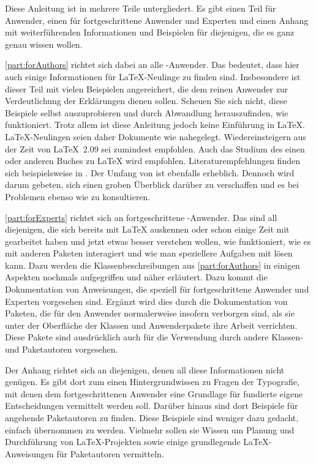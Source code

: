 Diese Anleitung ist in mehrere Teile untergliedert. Es gibt einen Teil für
Anwender, einen für fortgeschrittene Anwender und Experten und einen Anhang
mit weiterführenden Informationen und Beispielen für diejenigen, die es ganz
genau wissen wollen.

\autoref{part:forAuthors} richtet sich dabei an alle \KOMAScript-Anwender. Das
bedeutet, dass hier auch einige Informationen für \LaTeX-Neulinge zu finden
sind. Insbesondere ist dieser Teil mit vielen Beispielen angereichert, die dem
reinen Anwender zur Verdeutlichung der Erklärungen dienen sollen. Scheuen Sie
sich nicht, diese Beispiele selbst auszuprobieren und durch Abwandlung
herauszufinden, wie \KOMAScript{} funktioniert. Trotz allem ist diese
Anleitung jedoch keine Einführung in \LaTeX. \LaTeX-Neulingen seien daher
Dokumente wie \cite{l2kurz} nahegelegt. Wiedereinsteigern aus der Zeit von
\LaTeX~2.09 sei zumindest \cite{latex:usrguide} empfohlen. Auch das Studium des
einen oder anderen Buches zu \LaTeX{} wird empfohlen.  Literaturempfehlungen
finden sich beispielsweise in \cite{DANTE:FAQ}. Der Umfang von
\cite{DANTE:FAQ} ist ebenfalls erheblich. Dennoch wird darum gebeten, sich
einen groben Überblick darüber zu verschaffen und es bei Problemen ebenso wie
 zu konsultieren.

\autoref{part:forExperts} richtet sich an fortgeschrittene
\KOMAScript-Anwender. Das sind all diejenigen, die sich bereits mit \LaTeX{}
auskennen oder schon einige Zeit mit \KOMAScript{} gearbeitet haben und jetzt
etwas besser verstehen wollen, wie \KOMAScript{} funktioniert, wie es mit
anderen Paketen interagiert und wie man speziellere Aufgaben mit \KOMAScript{}
lösen kann. Dazu werden die Klassenbeschreibungen aus
\autoref{part:forAuthors} in einigen Aspekten nochmals aufgegriffen und näher
erläutert. Dazu kommt die Dokumentation von Anweisungen, die speziell für
fortgeschrittene Anwender und Experten vorgesehen sind. Ergänzt wird dies
durch die Dokumentation von Paketen, die für den Anwender normalerweise insofern
verborgen sind, als sie unter der Oberfläche der Klassen und Anwenderpakete
ihre Arbeit verrichten. Diese Pakete sind ausdrücklich auch für die Verwendung
durch andere Klassen- und Paketautoren vorgesehen.

Der Anhang richtet sich
an diejenigen, denen all diese Informationen nicht genügen. Es gibt dort zum
einen Hintergrundwissen zu Fragen der Typografie, mit denen dem
fortgeschrittenen Anwender eine Grundlage für fundierte eigene Entscheidungen
vermittelt werden soll. Darüber hinaus sind dort Beispiele für angehende
Paketautoren zu finden. Diese Beispiele sind weniger dazu gedacht, einfach
übernommen zu werden. Vielmehr sollen sie Wissen um Planung und Durchführung
von \LaTeX-Projekten sowie einige grundlegende \LaTeX-Anweisungen für
Paketautoren vermitteln.

